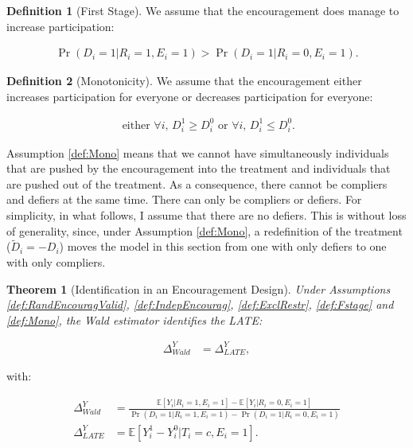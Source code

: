 \documentclass[
]{book}
\newcommand{\esp}[1]{\mathbb{E}[ #1 ]}
\newtheorem{theorem}{Theorem}[chapter]
\theoremstyle{definition}
\newtheorem{definition}{Definition}[chapter]
\theoremstyle{definition}
\theoremstyle{definition}
\theoremstyle{definition}
\theoremstyle{remark}
\begin{document}
\begin{definition}[First Stage]
\protect\hypertarget{def:Fstage}{}{\label{def:Fstage} \iffalse (First Stage) \fi{} }We assume that the encouragement does manage to increase participation:

\begin{align*}
  \Pr(D_i=1|R_i=1,E_i=1) > \Pr(D_i=1|R_i=0,E_i=1).
\end{align*}
\end{definition}

\begin{definition}[Monotonicity]
\protect\hypertarget{def:Mono}{}{\label{def:Mono} \iffalse (Monotonicity) \fi{} }We assume that the encouragement either increases participation for everyone or decreases participation for everyone:

\begin{align*}
  \text{ either } \forall i\text{, }D_i^1\geq D_i^0 \text{ or } \forall i\text{, }D_i^1\leq D_i^0 .
\end{align*}
\end{definition}

Assumption \ref{def:Mono} means that we cannot have simultaneously individuals that are pushed by the encouragement into the treatment and individuals that are pushed out of the treatment.
As a consequence, there cannot be compliers and defiers at the same time.
There can only be compliers or defiers.
For simplicity, in what follows, I assume that there are no defiers.
This is without loss of generality, since, under Assumption \ref{def:Mono}, a redefinition of the treatment (\(\tilde{D}_i=-D_i\)) moves the model in this section from one with only defiers to one with only compliers.

\begin{theorem}[Identification in an Encouragement Design]
\protect\hypertarget{thm:IdentLATE}{}{\label{thm:IdentLATE} \iffalse (Identification in an Encouragement Design) \fi{} }Under Assumptions \ref{def:RandEncouragValid}, \ref{def:IndepEncourag}, \ref{def:ExclRestr}, \ref{def:Fstage} and \ref{def:Mono}, the Wald estimator identifies the LATE:

\begin{align*}
  \Delta^Y_{Wald} & = \Delta^Y_{LATE},
\end{align*}
\end{theorem}

with:

\begin{align*}
  \Delta^Y_{Wald} & = \frac{\esp{Y_i|R_i=1,E_i=1} - \esp{Y_i|R_i=0,E_i=1}}{\Pr(D_i=1|R_i=1,E_i=1)-\Pr(D_i=1|R_i=0,E_i=1)}\\
  \Delta^Y_{LATE} & = \esp{Y^1_i-Y^0_i|T_i=c,E_i=1}.
\end{align*}
\end{document}
